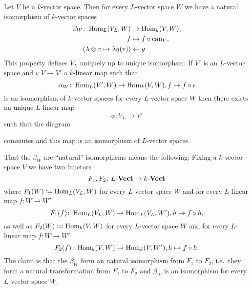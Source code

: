 \begin{thrm}
  Let $V$ be a $k$-vector space. Then for every $L$-vector space $W$ we have a natural isomorphism of $k$-vector spaces
  \begin{align*}
              \beta_W
    \colon    \operatorname{Hom}_L(V_L, W)
    &\to      \operatorname{Hom}_k(V,W), \\
              f
     &\mapsto f \circ \operatorname{can}_V, \\
              ( \lambda \otimes v \mapsto \lambda g(v) )
    &\mapsfrom g
  \end{align*}
  This property defines $V_L$ uniquely up to unique isomorphsm:
  If $V'$ is an $L$-vector space and $\iota \colon V \to V'$ a $k$-linear map such that
  \[
            \alpha_W
    \colon  \operatorname{Hom}_L(V', W)
    \to     \operatorname{Hom}_k(V,W),
            f
    \mapsto f \circ \iota
  \]
  is an isomorphism of $k$-vector spaces for every $L$-vector space $W$ then there exists an unique $L$-linear map
  \[
    \phi \colon V_L \to V'
  \]
  such that the diagram
  \begin{center}
  \end{center}
  commutes and this map is an isomorphism of $L$-vector spaces.
\end{thrm}


That the $\beta_W$ are ``natural'' isomorphisms means the following:
Fixing a $k$-vector space $V$ we have two functors
\[
          F_1, F_2
  \colon  L\text{-}\mathbf{Vect}
  \to     k\text{-}\mathbf{Vect}
\]
where $F_1(W) \coloneqq \operatorname{Hom}_L(V_L,W)$ for every $L$-vector space $W$ and for every $L$-linear map $f \colon W \to W'$
\[
          F_1(f)
  \colon  \operatorname{Hom}_L(V_L, W)
  \to     \operatorname{Hom}_L(V_L, W'),
          h
  \mapsto f \circ h,
\]
as well as $F_2(W) \coloneqq \operatorname{Hom}_k(V,W)$ for every $L$-vector space $W$ and for every $L$-linear map $f \colon W \to W'$
\[
          F_2(f)
  \colon  \operatorname{Hom}_k(V,W)
  \to     \operatorname{Hom}_k(V,W'),
          h
  \mapsto f \circ h.
\]
The claim is that the $\beta_W$ form an natural isomorphism from $F_1$ to $F_2$, i.e.\ they form a natural transformation from $F_1$ to $F_2$ and $\beta_W$ is an isomorphism for every $L$-vector space $W$.


